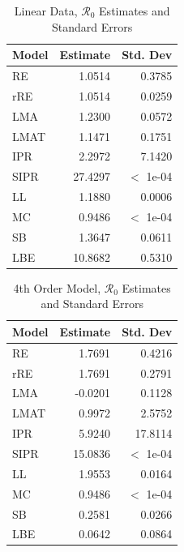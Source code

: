 \documentclass[12pt]{article}
\newcommand{\rr}{\ensuremath{\mathcal{R}_0}}
\begin{document}
\begin{table}[H]
	
	\centering
	\begin{tabular}[t]{l|r|r}
		\hline
		Model & Estimate & Std. Dev\\
		\hline
		RE & 1.0514 & 0.3785\\
		\hline
		rRE & 1.0514 & 0.0259\\
		\hline
		LMA & 1.2300 & 0.0572\\
		\hline
		LMAT & 1.1471 & 0.1751\\
		\hline
		IPR & 2.2972 & 7.1420\\
		\hline
		SIPR & 27.4297 & $<$ 1e-04\\
		\hline
		LL & 1.1880 & 0.0006\\
		\hline
		MC & 0.9486 & $<$ 1e-04\\
		\hline
		SB & 1.3647 & 0.0611\\
		\hline
		LBE & 10.8682 & 0.5310\\
		\hline
	\end{tabular}
	\caption{Linear Data, $\rr$ Estimates and Standard Errors}
\end{table}

\begin{table}[H]
	
	
	\centering
	\begin{tabular}[t]{l|r|r}
		\hline
		Model & Estimate & Std. Dev\\
		\hline
		RE & 1.7691 & 0.4216\\
		\hline
		rRE & 1.7691 & 0.2791\\
		\hline
		LMA & -0.0201 & 0.1128\\
		\hline
		LMAT & 0.9972 & 2.5752\\
		\hline
		IPR & 5.9240 & 17.8114\\
		\hline
		SIPR & 15.0836 & $<$ 1e-04\\
		\hline
		LL & 1.9553 & 0.0164\\
		\hline
		MC & 0.9486 & $<$ 1e-04\\
		\hline
		SB & 0.2581 & 0.0266\\
		\hline
		LBE & 0.0642 & 0.0864\\
		\hline
	\end{tabular}
	\caption{4th Order Model, $\rr$ Estimates and Standard Errors}
\end{table}
\end{document}
